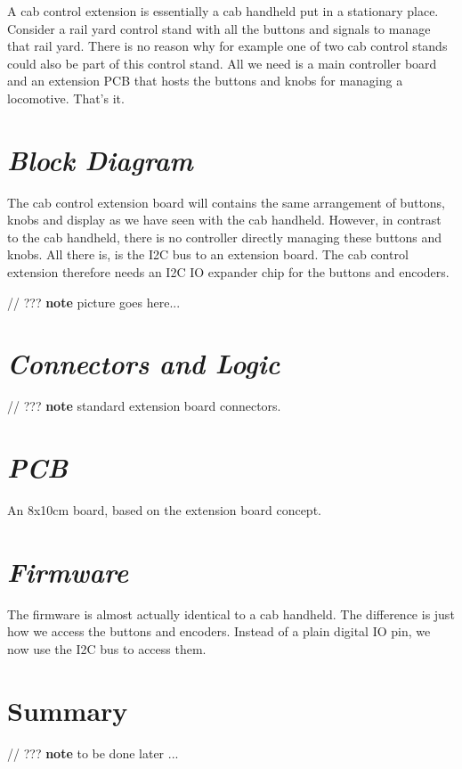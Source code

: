 
A cab control extension is essentially a cab handheld put in a stationary place. Consider a rail yard control stand with all the buttons and signals to manage that rail yard. There is no reason why for example one of two cab control stands could also be part of this control stand. All we need is a main controller board and an extension PCB that hosts the buttons and knobs for managing a locomotive. That's it.

\section{\textit{Block Diagram}}

The cab control extension board will contains the same arrangement of buttons, knobs and display as we have seen with the cab handheld. However, in contrast to the cab handheld, there is no controller directly managing these buttons and knobs. All there is, is the I2C bus to an extension board. The cab control extension therefore needs an I2C IO expander chip for the buttons and encoders.

// ??? \textbf{note} picture goes here...

\section{\textit{Connectors and Logic}}

// ??? \textbf{note} standard extension board connectors.

\section{\textit{PCB}}

An 8x10cm board, based on the extension board concept.

\section{\textit{Firmware}}

The firmware is almost actually identical to a cab handheld. The difference is just how we access the buttons and encoders. Instead of a plain digital IO pin, we now use the I2C bus to access them.

\section{Summary}

// ??? \textbf{note} to be done later ...
